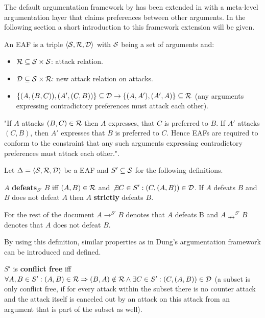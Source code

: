 The default argumentation framework by \cite{dung1995} has been extended in \cite{Modgil2009} with a meta-level argumentation layer that claims preferences between other arguments. In the following section a short introduction to this framework extension will be given. 

\begin{definition}
	An \gls{EAF} is a triple $\langle \S, \R, \D \rangle$ with $\S$ being a set of arguments and:
	\begin{itemize}
		\item $\R \subseteq \S \times \S$: attack relation.
		\item $\D \subseteq \S \times \R$: new attack relation on attacks.
		\item $\{(A, (B, C)), (A', (C, B))\} \subseteq \D \rightarrow \{(A, A'), (A', A)\} \subseteq \R$ (any arguments expressing contradictory preferences must attack each other).
	\end{itemize}
\end{definition}

\begin{remark}
"If $A$ attacks $(B, C) \in \R$ then $A$ expresses, that $C$ is preferred to $B$. If $A'$ attacks $(C, B)$, then $A'$ expresses that $B$ is preferred to $C$. Hence \glspl{EAF} are required to conform to the constraint that any such arguments expressing contradictory preferences must attack each other."\cite{Modgil2009}.
\end{remark}

Let $\Delta = \langle \S, \R, \D \rangle$ be a \gls{EAF} and $S' \subseteq \S$ for the following definitions.

\begin{definition}
$A$ \textbf{defeats$_{S'}$} $B$ iff $(A, B) \in \R$ and $\not \exists C \in S': (C, (A, B)) \in \D$. If $A$ defeats $B$ and $B$ does not defeat $A$ then $A$ \textbf{strictly} defeats $B$.
\end{definition}

\begin{notation}
For the rest of the document $A \rightarrow^{S'} B$ denotes that $A$ defeats B and $A \nrightarrow^{S'} B$ denotes that $A$ does not defeat $B$.
\end{notation}


By using this definition, similar properties as in Dung's argumentation framework can be introduced and defined.

\begin{definition}
	$S'$ is \textbf{conflict free} iff $\forall A, B \in S': (A, B) \in \R \Rightarrow (B, A) \notin \R \wedge \exists C \in S': (C, (A, B)) \in \D$ (a subset is only conflict free, if for every attack within the subset there is no counter attack and the attack itself is canceled out by an attack on this attack from an argument that is part of the subset as well).
\end{definition}


